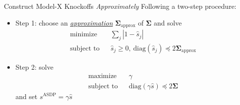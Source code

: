     \begin{frame}{Construct Model-X Knockoffs \textit{Approximately}}
        Following a two-step procedure:
        \begin{itemize}
            \item<+-> Step 1: choose an \textcolor{glaucous!65!white}{\underline{\textit{approximation}}} $\boldsymbol{\Sigma}_{\mathrm{approx}}$ of $\boldsymbol{\Sigma}$  and solve
            \begin{align*}
                \text{minimize} && \sum_j\left\vert 1-\hat{s}_j \right\vert \\
                \text{subject to} && \hat{s}_j\geq 0, \ \mathrm{diag}\left(\hat{s}_j\right)\preceq 2\boldsymbol{\Sigma}_{\mathrm{approx}}
            \end{align*}
            \item<+-> Step 2: solve 
            \begin{align*}
                \text{maximize} && \gamma \\
                \text{subject to} && \mathrm{diag}\left(\gamma \hat{s}\right)\preceq 2\boldsymbol{\Sigma}
            \end{align*}
            and set $s^{\mathrm{ASDP}}=\gamma \hat{s}$
        \end{itemize}
    \end{frame}

